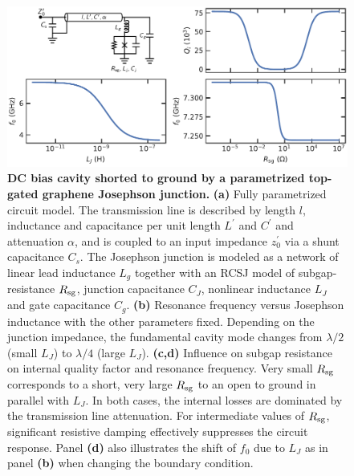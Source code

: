 \begin{figure}
	\centering
	\includegraphics[width=\linewidth]{chapter-introduction/figs/model_DC_bias_cavity_params_RCSJ.pdf}
	\caption{
		\textbf{DC bias cavity shorted to ground by a parametrized top-gated graphene Josephson junction.}
		\textbf{(a)} Fully parametrized circuit model.
		The transmission line is described by length $l$, inductance and capacitance per unit length $L^\prime$ and $C^\prime$ and attenuation $\alpha$, and is coupled to an input impedance $z_0^\prime$ via a shunt capacitance $C_s$.
		The Josephson junction is modeled as a network of linear lead inductance $L_g$ together with an RCSJ model of subgap-resistance $R_{\rm sg}$, junction capacitance $C_J$, nonlinear inductance $L_J$ and gate capacitance $C_g$.
		\textbf{(b)} Resonance frequency versus Josephson inductance with the other parameters fixed.
		Depending on the junction impedance, the fundamental cavity mode changes from $\lambda/2$ (small $L_J$) to $\lambda/4$ (large $L_J$).
		\textbf{(c,d)} Influence on subgap resistance on internal quality factor and resonance frequency.
		Very small $R_{\rm sg}$ corresponds to a short, very large $R_{\rm sg}$ to an open to ground in parallel with $L_J$.
		In both cases, the internal losses are dominated by the transmission line attenuation.
		For intermediate values of $R_{\rm sg}$, significant resistive damping effectively suppresses the circuit response.
		Panel \textbf{(d)} also illustrates the shift of $f_0$ due to $L_J$ as in panel \textbf{(b)} when changing the boundary condition.
	}
	\label{fig:TLmodel}
\end{figure}



